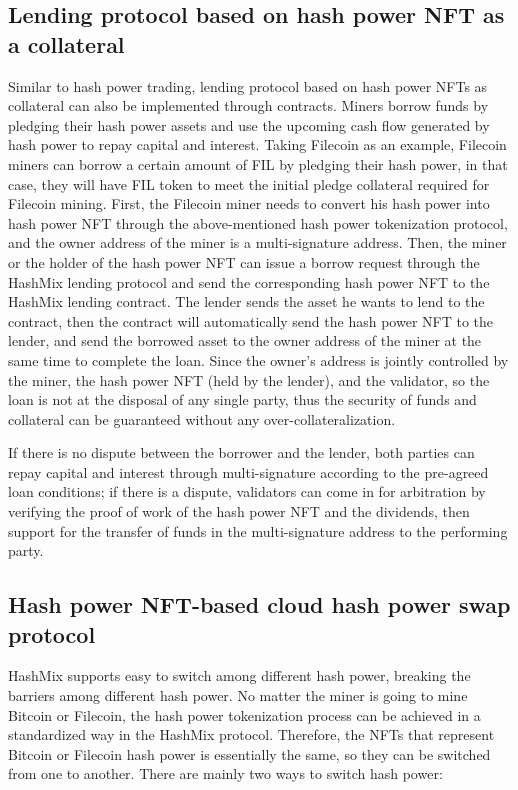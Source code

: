 \documentclass[]{template/llncs}
\begin{document}
\subsection{Lending protocol based on hash power NFT as a collateral}

Similar to hash power trading, lending protocol based on hash power NFTs as collateral can also be implemented through contracts. Miners borrow funds by pledging their hash power assets and use the upcoming cash flow generated by hash power to repay capital and interest. Taking Filecoin as an example, Filecoin miners can borrow a certain amount of FIL by pledging their hash power, in that case, they will have FIL token to meet the initial pledge collateral required for Filecoin mining. First, the Filecoin miner needs to convert his hash power into hash power NFT through the above-mentioned hash power tokenization protocol, and the owner address of the miner is a multi-signature address. Then, the miner or the holder of the hash power NFT can issue a borrow request through the HashMix lending protocol and send the corresponding hash power NFT to the HashMix lending contract. The lender sends the asset he wants to lend to the contract, then the contract will automatically send the hash power NFT to the lender, and send the borrowed asset to the owner address of the miner at the same time to complete the loan. Since the owner's address is jointly controlled by the miner, the hash power NFT (held by the lender), and the validator, so the loan is not at the disposal of any single party, thus the security of funds and collateral can be guaranteed without any over-collateralization.

If there is no dispute between the borrower and the lender, both parties can repay capital and interest through multi-signature according to the pre-agreed loan conditions; if there is a dispute, validators can come in for arbitration by verifying the proof of work of the hash power NFT and the dividends, then support for the transfer of funds in the multi-signature address to the performing party.

\subsection{Hash power NFT-based cloud hash power swap protocol}

HashMix supports easy to switch among different hash power, breaking the barriers among different hash power. No matter the miner is going to mine Bitcoin or Filecoin, the hash power tokenization process can be achieved in a standardized way in the HashMix protocol. Therefore, the NFTs that represent Bitcoin or Filecoin hash power is essentially the same, so they can be switched from one to another. There are mainly two ways to switch hash power:
\end{document}
